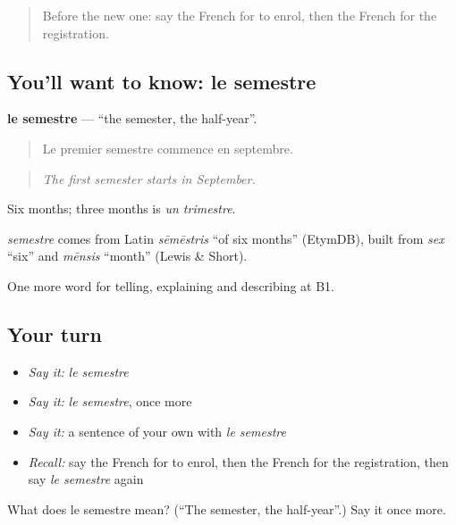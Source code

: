 \begin{quote}
Before the new one: say the French for to enrol, then the French for the registration.
\end{quote}

\subsection*{You'll want to know: le semestre}
\textbf{le semestre} — \textquotedblleft{}the semester, the half-year\textquotedblright{}.

\begin{quote}
Le premier semestre commence en septembre.
\end{quote}

\begin{quote}
\emph{The first semester starts in September.}
\end{quote}

Six months; three months is \emph{un trimestre}.

\begin{cousinweb}
\emph{semestre} comes from Latin \emph{sēmēstris} \textquotedblleft{}of six months\textquotedblright{} (EtymDB), built from \emph{sex} \textquotedblleft{}six\textquotedblright{} and \emph{mēnsis} \textquotedblleft{}month\textquotedblright{} (Lewis \& Short).
\end{cousinweb}

\begin{grammarlens}[title={What you've built}]
One more word for telling, explaining and describing at B1.
\end{grammarlens}

\subsection*{Your turn}
\begin{itemize}
\raggedright
  \item \emph{Say it:} \emph{le semestre}
  \item \emph{Say it:} \emph{le semestre}, once more
  \item \emph{Say it:} a sentence of your own with \emph{le semestre}
  \item \emph{Recall:} say the French for to enrol, then the French for the registration, then say \emph{le semestre} again
\end{itemize}

\begin{tcolorbox}[breakable,colback=teal!4,colframe=teal!35!black,title={Before you move on}]
What does le semestre mean? (\textquotedblleft{}The semester, the half-year\textquotedblright{}.) Say it once more.
\end{tcolorbox}
